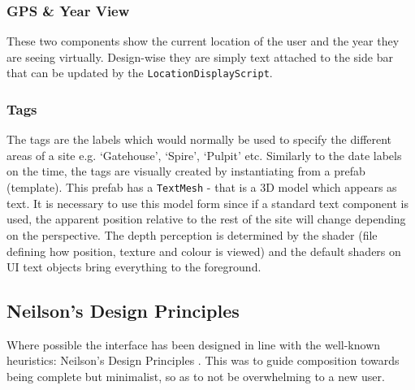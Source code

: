 \documentclass[12pt, a4paper]{article}
\begin{document}
\subsubsection{GPS \& Year View}
These two components show the current location of the user and the year they are seeing virtually. Design-wise they are simply text attached to the side bar that can be updated by the \verb|LocationDisplayScript|. 

\subsubsection{Tags}
The tags are the labels which would normally be used to specify the different areas of a site e.g. `Gatehouse', `Spire', `Pulpit' etc. Similarly to the date labels on the time, the tags are visually created by instantiating from a prefab (template). This prefab has a \verb|TextMesh| - that is a 3D model which appears as text. It is necessary to use this model form since if a standard text component is used, the apparent position relative to the rest of the site will change depending on the perspective. The depth perception is determined by the shader (file defining how position, texture and colour is viewed) and the default shaders on UI text objects bring everything to the foreground.

\subsection{Neilson's Design Principles}
Where possible the interface has been designed in line with the well-known heuristics: Neilson's Design Principles \cite{design:neilsons}. This was to guide composition towards being complete but minimalist, so as to not be overwhelming to a new user.
\end{document}
